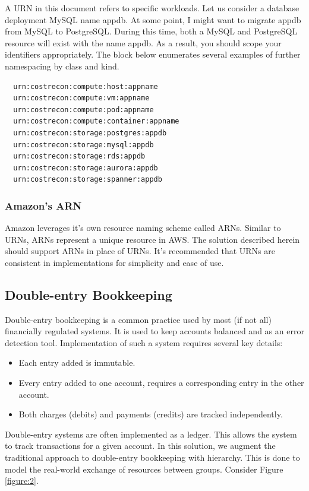 \documentclass[10pt, a4paper, twocolumn]{article}
\begin{document}
    A URN in this document refers to specific workloads.
    Let us consider a database deployment MySQL name appdb.
    At some point, I might want to migrate appdb from MySQL to PostgreSQL.
    During this time, both a MySQL and PostgreSQL resource will exist with the name appdb.
    As a result, you should scope your identifiers appropriately.
    The block below enumerates several examples of further namespacing by class and kind.

\begin{verbatim}
  urn:costrecon:compute:host:appname
  urn:costrecon:compute:vm:appname
  urn:costrecon:compute:pod:appname
  urn:costrecon:compute:container:appname
  urn:costrecon:storage:postgres:appdb
  urn:costrecon:storage:mysql:appdb
  urn:costrecon:storage:rds:appdb
  urn:costrecon:storage:aurora:appdb
  urn:costrecon:storage:spanner:appdb
\end{verbatim}

    \subsubsection*{Amazon's ARN}
      Amazon leverages it's own resource naming scheme called ARNs.
      Similar to URNs, ARNs represent a unique resource in AWS.
      The solution described herein should support ARNs in place of URNs.
      It's recommended that URNs are consistent in implementations for simplicity and ease of use.

  \subsection*{Double-entry Bookkeeping}
    Double-entry bookkeeping is a common practice used by most (if not all) financially regulated systems.
    It is used to keep accounts balanced and as an error detection tool.
    Implementation of such a system requires several key details:

    \begin{itemize}
      \item Each entry added is immutable.
      \item Every entry added to one account, requires a corresponding entry in the other account.
      \item Both charges (debits) and payments (credits) are tracked independently.
    \end{itemize}

    Double-entry systems are often implemented as a ledger.
    This allows the system to track transactions for a given account.
    In this solution, we augment the traditional approach to double-entry bookkeeping with hierarchy.
    This is done to model the real-world exchange of resources between groups.
    Consider Figure \ref{figure:2}.
\end{document}

